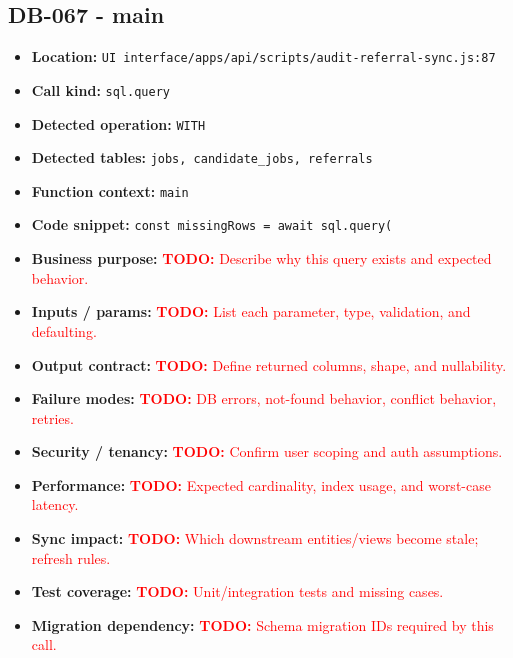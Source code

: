 \documentclass[11pt]{article}
\newcommand{\todoitem}[1]{\textcolor{red}{\textbf{TODO:} #1}}
\begin{document}
\subsection{DB-067 - main}
\begin{itemize}[leftmargin=1.5em]
\item \textbf{Location:} \texttt{UI interface/apps/api/scripts/audit-referral-sync.js:87}
\item \textbf{Call kind:} \texttt{sql.query}
\item \textbf{Detected operation:} \texttt{WITH}
\item \textbf{Detected tables:} \texttt{jobs, candidate\_jobs, referrals}
\item \textbf{Function context:} \texttt{main}
\item \textbf{Code snippet:} \texttt{const missingRows = await sql.query(}
\item \textbf{Business purpose:} \todoitem{Describe why this query exists and expected behavior.}
\item \textbf{Inputs / params:} \todoitem{List each parameter, type, validation, and defaulting.}
\item \textbf{Output contract:} \todoitem{Define returned columns, shape, and nullability.}
\item \textbf{Failure modes:} \todoitem{DB errors, not-found behavior, conflict behavior, retries.}
\item \textbf{Security / tenancy:} \todoitem{Confirm user scoping and auth assumptions.}
\item \textbf{Performance:} \todoitem{Expected cardinality, index usage, and worst-case latency.}
\item \textbf{Sync impact:} \todoitem{Which downstream entities/views become stale; refresh rules.}
\item \textbf{Test coverage:} \todoitem{Unit/integration tests and missing cases.}
\item \textbf{Migration dependency:} \todoitem{Schema migration IDs required by this call.}
\end{itemize}
\end{document}
